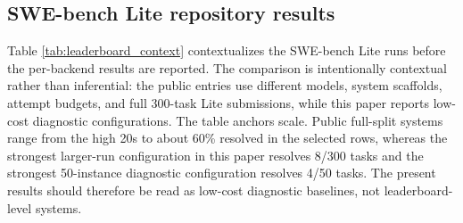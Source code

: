 \documentclass[preprint,12pt]{elsarticle}
\begin{document}
\subsection{SWE-bench Lite repository results}

Table \ref{tab:leaderboard_context} contextualizes the SWE-bench Lite runs before the per-backend results are reported. The comparison is intentionally contextual rather than inferential: the public entries use different models, system scaffolds, attempt budgets, and full 300-task Lite submissions, while this paper reports low-cost diagnostic configurations. The table anchors scale. Public full-split systems range from the high 20s to about 60\% resolved in the selected rows, whereas the strongest larger-run configuration in this paper resolves 8/300 tasks and the strongest 50-instance diagnostic configuration resolves 4/50 tasks. The present results should therefore be read as low-cost diagnostic baselines, not leaderboard-level systems.
\end{document}
